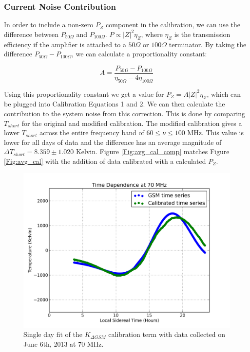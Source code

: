\subsubsection{Current Noise Contribution}
In order to include a non-zero $P_Z$ component in the calibration, we can use the difference between $P_{50 \Omega}$ and $P_{100 \Omega}$. $P \propto |Z|^2 \eta_{Z}$, where $\eta_Z$ is the transmission efficiency if the amplifier is attached to a $50 \Omega$ or $100 \Omega$ terminator. By taking the difference $P_{50 \Omega}-P_{100 \Omega}$, we can calculate a proportionality constant:

\begin{equation}
A = \frac{P_{50 \Omega} - P_{100 \Omega}}{\eta_{50 \Omega} - 4 \eta_{100 \Omega}}
\end{equation}

Using this proportionality constant we get a value for $P_{Z} = A |Z|^2 \eta_{Z}$, which can be plugged into Calibration Equations 1 and 2. We can then calculate the contribution to the system noise from this correction. This is done by comparing $T_{short}$ for the original and modified calibration. The modified calibration gives a lower $T_{short}$ across the entire frequency band of $60 \leq \nu \leq 100$ MHz. This value is lower for all days of data and the difference has an average magnitude of $\Delta T_{short} = 8.359 \pm 1.020$ Kelvin. Figure \ref{Fig:avg_cal_comp} matches Figure \ref{Fig:avg_cal} with the addition of data calibrated with a calculated $P_{Z}$.

\begin{figure}[htb]
\begin{center}
\includegraphics[width=0.95\linewidth]{Data_analysis/figures/June_06_K_dgsm_time_series.png}
\caption{Single day fit of the $K_{\Delta GSM}$ calibration term with data collected on June 6th, 2013 at 70 MHz. }
\label{Fig:Kdgsm}
\end{center}
\end{figure}

